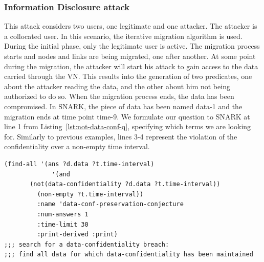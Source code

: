\subsubsection{Information Disclosure attack}
This attack considers two users, one legitimate and one attacker.
The attacker is a collocated user.
In this scenario, the iterative migration algorithm is used.
During the initial phase, only the legitimate user is active.
The migration process starts and nodes and links are being migrated, one after another.
At some point during the migration, the attacker will start his attack to gain access to the data carried through the VN.
This results into the generation of two predicates, one about the attacker reading the data, and the other about him not being authorized to do so. 
When the migration process ends, the data has been compromised.
In SNARK, the piece of data has been named data-1 and the migration ends at time point time-9.
We formulate our question to SNARK at line 1 from Listing~\ref{lst:not-data-conf-q}, specifying which terms we are looking for.
Similarly to previous examples, lines 3-4 represent the violation of the confidentiality over a non-empty time interval.

\begin{lstlisting}[caption=SNARK question to detect the data confidentiality violation., label=lst:not-data-conf-q,captionpos=b] 
   (find-all '(ans ?d.data ?t.time-interval)
             '(and
       (not(data-confidentiality ?d.data ?t.time-interval))
         (non-empty ?t.time-interval))
         :name 'data-conf-preservation-conjecture
         :num-answers 1
         :time-limit 30
         :print-derived :print)
;;; search for a data-confidentiality breach:
;;; find all data for which data-confidentiality has been maintained

\end{lstlisting}

